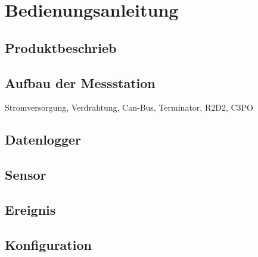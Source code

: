 %
%

\chapter{Bedienungsanleitung}\label{chap.bedienung}

\section{Produktbeschrieb}\label{sec.manualproduct}


\section{Aufbau der Messstation}\label{sec.manualoverview}
Stromversorgung, Verdrahtung, Can-Bus, Terminator, R2D2, C3PO

\section{Datenlogger}\label{sec.manuallogger}


\section{Sensor}\label{sec.manualsensor}


\section{Ereignis}\label{sec.manualimpact}


\section{Konfiguration}\label{sec.manualkonfig}


